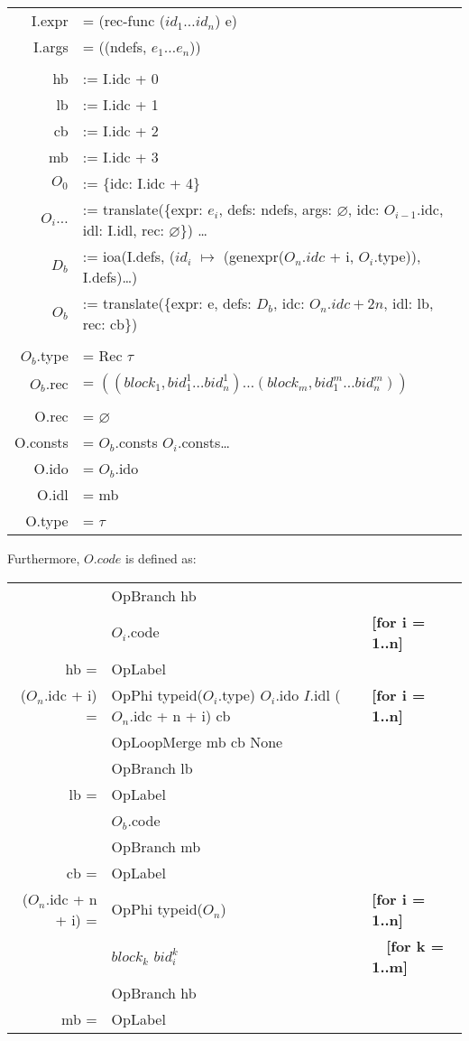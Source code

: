 \documentclass[letterpaper,12pt]{article}
\begin{document}
\medskip
\begin{tabularx}{\linewidth}{rl}
	I.expr &= (rec-func\: ($id_1 \dots id_n$) e) \\
	I.args &= ((ndefs, $e_1 \dots e_n$)) \\
	\\
	hb &:= I.idc + 0 \\
	lb &:= I.idc + 1 \\
	cb &:= I.idc + 2 \\
	mb &:= I.idc + 3 \\
	$O_0$ &:= \{idc: I.idc + 4\} \\
	$O_i\dots$ &:= translate(\{expr: $e_i$, defs: ndefs, args: $\varnothing$, idc: $O_{i - 1}$.idc, idl: I.idl, rec: $\varnothing$\}) \dots \\
	$D_b$ &:= ioa(I.defs, ($id_i$ $\mapsto$ (genexpr($O_n.idc$ + i, $O_i$.type)), I.defs)\dots) \\
	$O_b$ &:= translate(\{expr: e, defs: $D_b$, idc: $O_n.idc + 2n$, idl: lb, rec: cb\}) \\
	\\
	$O_b$.type &= Rec $\tau$ \\
	$O_b$.rec &= $((block_1, bid_1^1 \dots bid_n^1) \dots (block_m, bid_1^m \dots bid_n^m))$ \\
	\\
	O.rec &= $\varnothing$ \\
	O.consts &= $O_b$.consts $O_i$.consts\dots \\
	O.ido &= $O_b$.ido \\
	O.idl &= mb \\
	O.type &= $\tau$
\end{tabularx}

\medskip

Furthermore, $O.code$ is defined as: \\
\begin{tabularx}{\linewidth}{rll}
	&OpBranch hb \\
	&$O_i$.code & \textbf{[for i = 1..n]} \\
	\cline{1-2}
	hb = &OpLabel \\
	($O_n$.idc + i) = &OpPhi\: typeid($O_i$.type) $O_i$.ido $I$.idl ($O_n$.idc + n + i) cb & \textbf{[for i = 1..n]} \\
	&OpLoopMerge mb cb None \\
	&OpBranch lb \\
	\cline{1-2}
	lb = &OpLabel \\
	&$O_b$.code \\
	&OpBranch mb \\
	\cline{1-2}
	cb = &OpLabel \\
	($O_n$.idc + n + i) = &OpPhi typeid($O_n$) & \textbf{[for i = 1..n]} \\
		&\quad $block_k$ $bid_i^k$ & $\quad$\textbf{[for k = 1..m]} \\
	&OpBranch hb \\
	\cline{1-2}
	mb = &OpLabel
\end{tabularx}
\end{document}
